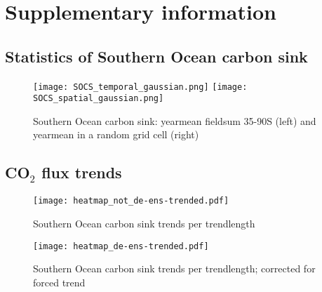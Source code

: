\documentclass[12pt]{article}
\begin{document}
\clearpage

\baselineskip18pt
%



\clearpage

\listoffigures

\clearpage


\appendix


\renewcommand{\thefigure}{A\arabic{figure}}
\section{Supplementary information}
\setcounter{figure}{0}
\subsection{Statistics of Southern Ocean carbon sink}

\begin{figure}[h]
	\texttt{[image: SOCS\_temporal\_gaussian.png]} %
	\texttt{[image: SOCS\_spatial\_gaussian.png]} %
	\caption{Southern Ocean carbon sink: yearmean fieldsum 35-90S (left) and yearmean in a random grid cell (right)}
	\label{fig:SOCS_temporal_gaussian}
\end{figure}


\clearpage
\subsection{CO$_2$ flux trends}

\begin{figure}[h]
	\texttt{[image: heatmap\_not\_de-ens-trended.pdf]} %
\caption{Southern Ocean carbon sink trends per trendlength}
	\label{fig:heatmap}
\end{figure}

\begin{figure}[h]
	\texttt{[image: heatmap\_de-ens-trended.pdf]} %
\caption{Southern Ocean carbon sink trends per trendlength; corrected for forced trend}
	\label{fig:heatmap_detrended}
\end{figure}
\end{document}
